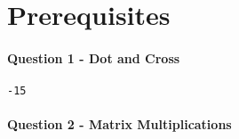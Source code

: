 \section{Prerequisites}\label{prerequisites}

\begin{Shaded}
\begin{Highlighting}[]
\end{Highlighting}
\end{Shaded}

\paragraph{Question 1 - Dot and Cross}\label{question-1---dot-and-cross}

\begin{Shaded}
\begin{Highlighting}[]
\OperatorTok{=}\NormalTok{ np.array([}\NormalTok{, }\NormalTok{, }\OperatorTok{{-}}\NormalTok{])}
\OperatorTok{=}\NormalTok{ np.array([}\NormalTok{, }\OperatorTok{{-}}\NormalTok{, }\NormalTok{])}
\end{Highlighting}
\end{Shaded}

\begin{verbatim}
-15
\end{verbatim}

\paragraph{Question 2 - Matrix
Multiplications}\label{question-2---matrix-multiplications}

\begin{Shaded}
\begin{Highlighting}[]
\OperatorTok{=}\NormalTok{ np.array([[}\NormalTok{, }\OperatorTok{{-}}\NormalTok{],}
\NormalTok{              [}\NormalTok{, }\NormalTok{]])}
\OperatorTok{=}\NormalTok{ np.array([[}\NormalTok{, }\NormalTok{], }
\NormalTok{              [}\OperatorTok{{-}}\NormalTok{, }\NormalTok{]])}
\NormalTok{(}\SpecialCharTok{\{}\SpecialStringTok{\textquotesingle{}}\NormalTok{)}
\end{Highlighting}
\end{Shaded}

